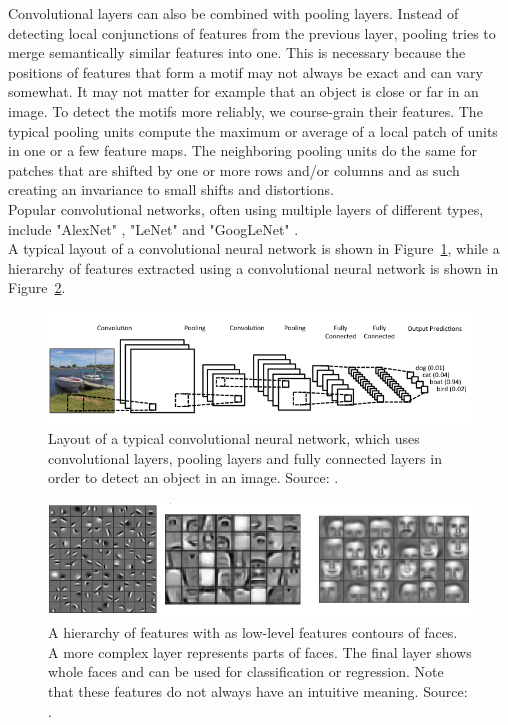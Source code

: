 Convolutional layers can also be combined with pooling layers. Instead of detecting local conjunctions of features from the previous layer, pooling tries to merge semantically similar features into one. This is necessary because the positions of features that form a motif may not always be exact and can vary somewhat. It may not matter for example that an object is close or far in an image.
To detect the motifs more reliably, we course-grain their features. The typical pooling units compute the maximum or average of a local patch of units in one or a few feature maps. The neighboring pooling units do the same for patches that are shifted by one or more rows and/or columns and as such creating an invariance to small shifts and distortions.\\
Popular convolutional networks, often using multiple layers of different types, include "AlexNet" \parencite{conf/nips/KrizhevskySH12}, "LeNet" \parencite{lecun-gradientbased-learning-applied-1998} and "GoogLeNet" \parencite{DBLP:journals/corr/SzegedyLJSRAEVR14}.\\
A typical layout of a convolutional neural network is shown in Figure~\ref{fig:cnnlayout}, while a hierarchy of features extracted using a convolutional neural network is shown in Figure~\ref{fig:cnnfeatures}.\\
\begin{figure}[htb]
    \centering
    \includegraphics[width=\linewidth]{images/cnnlayout.png}
    \caption[Convolutional neural network layout]{Layout of a typical convolutional neural network, which uses convolutional layers, pooling layers and fully connected layers in order to detect an object in an image. Source: \cite{clarifai}.}
    \label{fig:cnnlayout}
\end{figure}
\begin{figure}[htb]
    \centering
    \includegraphics[width=\linewidth]{images/cnnfeatures.png}
    \caption[Convolutional neural network features hierarchy]{A hierarchy of features with as low-level features contours of faces. A more complex layer represents parts of faces. The final layer shows whole faces and can be used for classification or regression. Note that these features do not always have an intuitive meaning. Source: \cite{conf/icml/LeeGRN09}.}
    \label{fig:cnnfeatures}
\end{figure}

